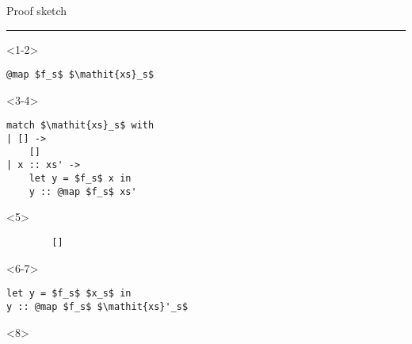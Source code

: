 \begin{frame}[fragile]{Proof sketch}
\begin{mathpar}
\end{mathpar}
\vfill
\hrule
\vfill
\begin{minipage}{.4\columnwidth}
    \begin{onlyenv}<1-2>
        \begin{lstlisting}
@map $f_s$ $\mathit{xs}_s$
        \end{lstlisting}
    \end{onlyenv}
    \begin{onlyenv}<3-4>
        \begin{lstlisting}
match $\mathit{xs}_s$ with
| [] ->
    []
| x :: xs' ->
    let y = $f_s$ x in
    y :: @map $f_s$ xs'
        \end{lstlisting}
    \end{onlyenv}
    \begin{onlyenv}<5>
        \begin{lstlisting}
        []
        \end{lstlisting}
    \end{onlyenv}
    \begin{onlyenv}<6-7>
        \begin{lstlisting}
let y = $f_s$ $x_s$ in
y :: @map $f_s$ $\mathit{xs}'_s$
        \end{lstlisting}
    \end{onlyenv}
    \begin{onlyenv}<8>

\end{onlyenv}
\end{minipage}
\end{frame}
